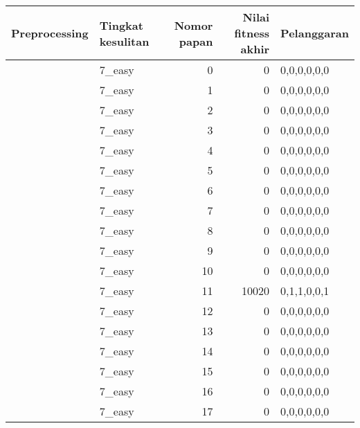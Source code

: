 \begin{tabular}{llrrl}
\hline
 Preprocessing   & Tingkat kesulitan   &   Nomor papan &   Nilai fitness akhir & Pelanggaran   \\
\hline
 [True]          & 7\_easy              &             0 &                     0 & 0,0,0,0,0,0   \\
 [True]          & 7\_easy              &             1 &                     0 & 0,0,0,0,0,0   \\
 [True]          & 7\_easy              &             2 &                     0 & 0,0,0,0,0,0   \\
 [True]          & 7\_easy              &             3 &                     0 & 0,0,0,0,0,0   \\
 [True]          & 7\_easy              &             4 &                     0 & 0,0,0,0,0,0   \\
 [True]          & 7\_easy              &             5 &                     0 & 0,0,0,0,0,0   \\
 [True]          & 7\_easy              &             6 &                     0 & 0,0,0,0,0,0   \\
 [True]          & 7\_easy              &             7 &                     0 & 0,0,0,0,0,0   \\
 [True]          & 7\_easy              &             8 &                     0 & 0,0,0,0,0,0   \\
 [True]          & 7\_easy              &             9 &                     0 & 0,0,0,0,0,0   \\
 [True]          & 7\_easy              &            10 &                     0 & 0,0,0,0,0,0   \\
 [True]          & 7\_easy              &            11 &                 10020 & 0,1,1,0,0,1   \\
 [True]          & 7\_easy              &            12 &                     0 & 0,0,0,0,0,0   \\
 [True]          & 7\_easy              &            13 &                     0 & 0,0,0,0,0,0   \\
 [True]          & 7\_easy              &            14 &                     0 & 0,0,0,0,0,0   \\
 [True]          & 7\_easy              &            15 &                     0 & 0,0,0,0,0,0   \\
 [True]          & 7\_easy              &            16 &                     0 & 0,0,0,0,0,0   \\
 [True]          & 7\_easy              &            17 &                     0 & 0,0,0,0,0,0   \\

\end{tabular}
